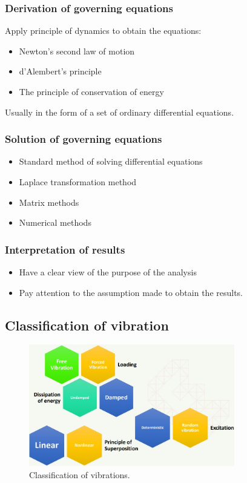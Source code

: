 \documentclass[class=report, crop=false, 12pt,a4paper]{standalone}
\begin{document}
\subsubsection{Derivation of governing equations}
Apply principle of dynamics to obtain the equations:
\begin{itemize}
    \item Newton's second law of motion
    \item d'Alembert's principle
    \item The principle of conservation of energy
\end{itemize}
Usually in the form of a set of ordinary differential equations.
\subsubsection{Solution of governing equations}
\begin{itemize}
    \item Standard method of solving differential equations
    \item Laplace transformation method
    \item Matrix methods
    \item Numerical methods
\end{itemize}
\subsubsection{Interpretation of results}
\begin{itemize}
    \item Have a clear view of the purpose of the analysis
    \item Pay attention to the assumption made to obtain the results.
\end{itemize}
\subsection{Classification of vibration}
\begin{figure}[H]
    \centering
    \includegraphics[width = 0.8\textwidth]{../img/diagram10.jpg}
    \caption{Classification of vibrations.}
\end{figure}
\end{document}
